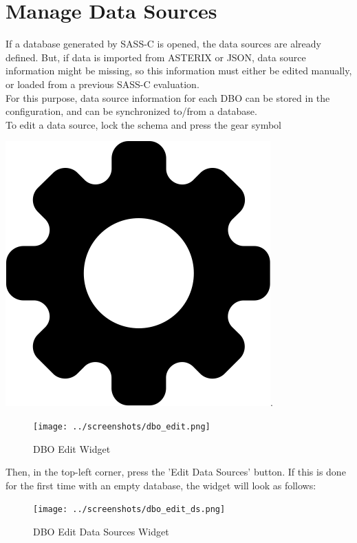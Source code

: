 \section{Manage Data Sources}
\label{sec:manage_datasources}

If a database generated by SASS-C is opened, the data sources are already defined. But, if data is imported from ASTERIX or JSON, data source information might be missing, so this information must either be edited manually, or loaded from a previous SASS-C evaluation. \\

For this purpose, data source information for each DBO can be stored in the configuration, and can be synchronized to/from a database. \\

To edit a data source, lock the schema and press the gear symbol {\includegraphics[scale=0.02]{../../data/icons/edit.png}.

\begin{figure}[H]
  \hspace*{-1.5cm}
    \texttt{[image: ../screenshots/dbo\_edit.png]}
  \caption{DBO Edit Widget}
  \label{fig:dbo_edit}
\end{figure}

Then, in the top-left corner, press the 'Edit Data Sources' button. If this is done for the first time with an empty database, the widget will look as follows:

\begin{figure}[H]
  \hspace*{-1cm}
    \texttt{[image: ../screenshots/dbo\_edit\_ds.png]}
  \caption{DBO Edit Data Sources Widget}
  \label{fig:dbo_edit_ds}
\end{figure}

}
